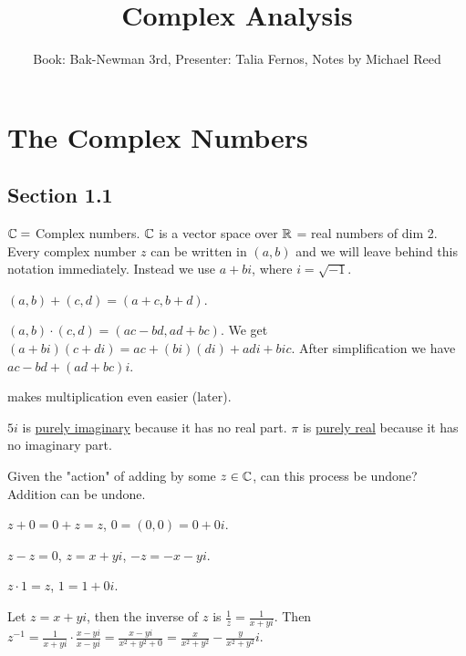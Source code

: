 \documentclass[]{article}
\author{Book: Bak-Newman 3rd, Presenter: Talia Fernos, Notes by Michael Reed}
\title{Complex Analysis}
\begin{document}
\maketitle

\section{The Complex Numbers}
\subsection{Section 1.1}
$\mathbb{C} = $ Complex numbers. $\mathbb{C}$ is a vector space over $\mathbb{R}$ = real numbers of dim 2. Every complex number $z$ can be written in  $(a,b)$ and we will leave behind this notation immediately. Instead we use $a+bi$, where $i=\sqrt{-1}$.
\begin{definition}
	[Addition] $(a,b)+(c,d)=(a+c,b+d)$.
\end{definition}
\begin{definition}
	[Multiplication] $(a,b)\cdot(c,d)=(ac-bd,ad+bc)$. We get $(a+bi)(c+di)=ac+(bi)(di)+adi+bic$. After simplification we have $ac-bd+(ad+bc)i$.
\end{definition}
\begin{definition}
	 makes multiplication even easier (later).
\end{definition}
\begin{example}
	$5i$ is \underline{purely imaginary} because it has no real part. $\pi$ is \underline{purely real} because it has no imaginary part.
\end{example}
\begin{example}
	Given the "action" of adding by some $z\in\mathbb{C}$, can this process be undone? Addition can be undone.%
\end{example}
\begin{definition}
	 $z+0=0+z=z$, $0=(0,0)=0+0i$.
\end{definition}
\begin{definition}
	 $z-z=0$, $z=x+yi$, $-z=-x-yi$.
\end{definition}
\begin{definition}
	 $z\cdot1=z$, $1=1+0i$.
\end{definition}
\begin{definition}
	 Let $z=x+yi$, then the inverse of $z$ is $\frac{1}{z}=\frac{1}{x+yi}$. Then $z^{-1}=\frac{1}{x+yi}\cdot\frac{x-yi}{x-yi}=\frac{x-yi}{x^2+y^2+0}=\frac{x}{x^2+y^2}-\frac{y}{x^2+y^2}i$.
\end{definition}
\end{document}
